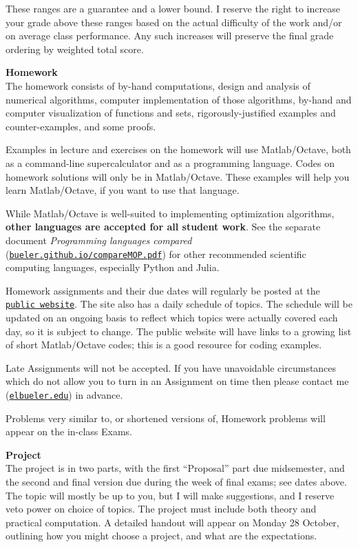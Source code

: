 \documentclass[12pt]{article}
\renewcommand{\emph}[1]{\textsf{\textbf{#1}}}
\newcommand{\localhead}[1]{\par\smallskip\textbf{#1} \smallskip\nobreak\\}%
\def\heading#1{\localhead{\large\emph{#1}}}
\begin{document}
These ranges are a guarantee and a lower bound.  I reserve the right to increase your grade above these ranges based on the actual difficulty of the work and/or on average class performance.  Any such increases will preserve the final grade ordering by weighted total score.


\heading{Homework}
The homework consists of by-hand computations, design and analysis of numerical algorithms, computer implementation of those algorithms, by-hand and computer visualization of functions and sets, rigorously-justified examples and counter-examples, and some proofs.

Examples in lecture and exercises on the homework will use Matlab/Octave, both as a command-line supercalculator and as a programming language.  Codes on homework solutions will only be in Matlab/Octave.  These examples will help you learn Matlab/Octave, if you want to use that language.

While Matlab/Octave is well-suited to implementing optimization algorithms, \emph{other languages are accepted for all student work}.  See the separate document \textsl{Programming languages compared} (\href{https://bueler.github.io/compareMOP.pdf}{\texttt{bueler.github.io/compareMOP.pdf}}) for other recommended scientific computing languages, especially Python and Julia.

Homework assignments and their due dates will regularly be posted at the \href{https://bueler.github.io/opt/}{\texttt{public website}}.  The site also has a daily schedule of topics.  The schedule will be updated on an ongoing basis to reflect which topics were actually covered each day, so it is subject to change.  The public website will have links to a growing list of short Matlab/Octave codes; this is a good resource for coding examples.

Late Assignments will not be accepted.  If you have unavoidable circumstances which do not allow you to turn in an Assignment on time then please contact me (\href{mailto:elbueler@alaska.edu}{\texttt{elbueler\@@alaska.edu}}) in advance.

Problems very similar to, or shortened versions of, Homework problems will appear on the in-class Exams.

\heading{Project}
The project is in two parts, with the first ``Proposal'' part due midsemester, and the second and final version due during the week of final exams; see dates above.  The topic will mostly be up to you, but I will make suggestions, and I reserve veto power on choice of topics.  The project must include both theory and practical computation.  A detailed handout will appear on Monday 28 October, outlining how you might choose a project, and what are the expectations.
\end{document}
